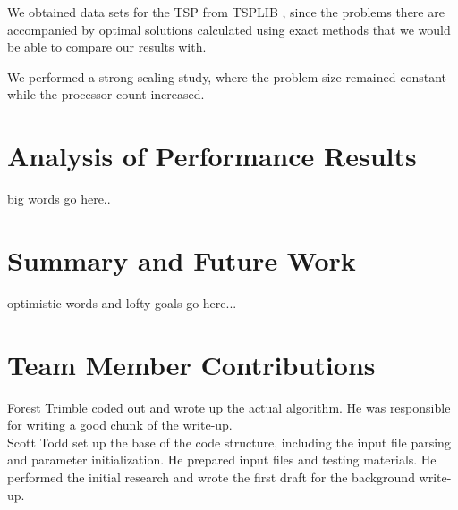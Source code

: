 \documentclass[twocolumn]{article}
\begin{document}
We obtained data sets for the TSP from TSPLIB \cite{tsplib}, since the problems
there are accompanied by optimal solutions calculated using exact methods that
we would be able to compare our results with.

We performed a strong scaling study, where the problem size remained constant
while the processor count increased.\\


\section{Analysis of Performance Results}

big words go here..\\


\section{Summary and Future Work}

optimistic words and lofty goals go here...\\

\section{Team Member Contributions}

\noindent Forest Trimble coded out and wrote up the actual algorithm. He was 
responsible for writing a good chunk of the write-up. \\

\noindent Scott Todd set up the base of the code structure, including the input
file parsing and parameter initialization. He prepared input files and testing
materials. He performed the initial research and wrote the first draft for the
background write-up.

\nocite{*}


\end{document}
